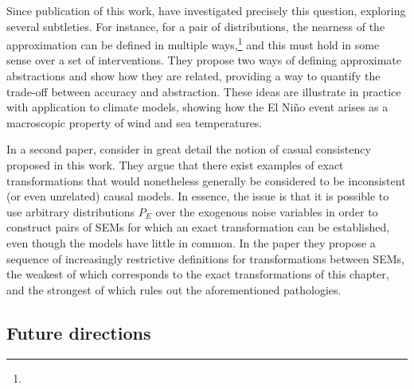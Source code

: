 Since publication of this work, \cite{beckers2019approximate} have investigated precisely this question, exploring several subtleties. 
For instance, for a pair of distributions, the nearness of the approximation can be defined in multiple ways,\footnote{}
and this must hold in some sense over a set of interventions. 
They propose two ways of defining approximate abstractions and show how they are related, providing a way to quantify the trade-off between accuracy and abstraction.
These ideas are illustrate in practice with application to climate models, showing how the El Ni\~no event arises as a macroscopic property of wind and sea temperatures.


In a second paper, \cite{beckers2019abstracting} consider in great detail the notion of casual consistency proposed in this work. 
They argue that there exist examples of exact transformations that would nonetheless generally be considered to be inconsistent (or even unrelated) causal models. 
In essence, the issue is that it is possible to use arbitrary distributions $P_E$ over the exogenous noise variables in order to construct pairs of SEMs for which an exact transformation can be established, even though the models have little in common.
In the paper they propose a sequence of increasingly restrictive definitions for transformations between SEMs, the weakest of which corresponds to the exact transformations of this chapter, and the strongest of which rules out the aforementioned pathologies.




\subsection{Future directions}

